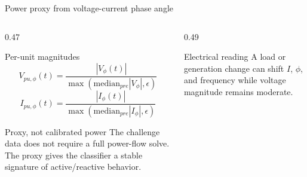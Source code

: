 \documentclass[10pt,aspectratio=169]{beamer}
\begin{document}
\begin{frame}{Power proxy from voltage-current phase angle}
\small
\begin{columns}[T,totalwidth=\textwidth]
\begin{column}{0.47\textwidth}
\begin{block}{Per-unit magnitudes}
\[
V_{pu,\phi}(t)=
\frac{|V_{\phi}(t)|}
{\max(\mathrm{median}_{pre}|V_{\phi}|,\epsilon)}
\]
\[
I_{pu,\phi}(t)=
\frac{|I_{\phi}(t)|}
{\max(\mathrm{median}_{pre}|I_{\phi}|,\epsilon)}
\]
\end{block}
\begin{alertblock}{Proxy, not calibrated power}
The challenge data does not require a full power-flow solve. The proxy gives the classifier a stable signature of active/reactive behavior.
\end{alertblock}
\end{column}
\begin{column}{0.49\textwidth}
\centering
{}
\vspace{1mm}
\begin{exampleblock}{Electrical reading}
A load or generation change can shift $I$, $\phi$, and frequency while voltage magnitude remains moderate.
\end{exampleblock}
\end{column}
\end{columns}
\end{frame}
\end{document}
